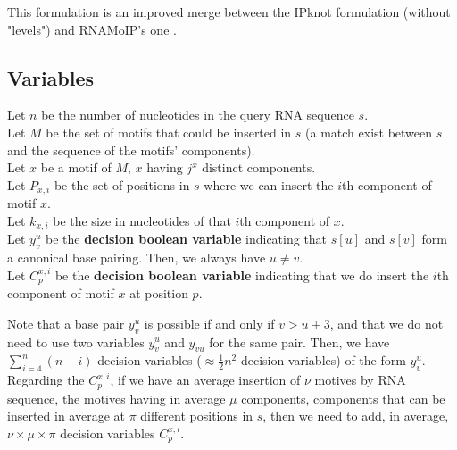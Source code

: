 \documentclass{article}
\begin{document}
This formulation is an improved merge between the IPknot \cite{sato_ipknot:_2011} formulation (without "levels") and RNAMoIP's one \cite{reinharz_towards_2012}.
	
	
\subsection{Variables} 
	
Let $n$ be the number of nucleotides in the query RNA sequence $s$.\\
Let $M$ be the set of motifs that could be inserted in $s$ (a match exist between $s$ and the sequence of the motifs' components).\\
Let $x$ be a motif of $M$, $x$ having $j^x$ distinct components.\\
Let $P_{x,i}$ be the set of positions in $s$ where we can insert the $i$th component of motif $x$.\\
Let $k_{x,i}$ be the size in nucleotides of that $i$th component of $x$.\\
Let $y^u_v$ be the \textbf{decision boolean variable} indicating that $s[u]$ and $s[v]$ form a canonical base pairing. Then, we always have $u \neq v$.\\
Let $C^{x,i}_p$ be the \textbf{decision boolean variable} indicating that we do insert the $i$th component of motif $x$ at position $p$.
	
	
Note that a base pair $y^u_v$ is possible if and only if $v>u+3$, and that we do not need to use two variables $y^u_v$ and $y_{vu}$ for the same pair. 
Then, we have $\sum_{i=4}^n (n-i)$ decision variables ($\approx \frac{1}{2}n^2$ decision variables) of the form $y^u_v$.
Regarding the $C^{x,i}_p$, if we have an average insertion of $\nu$ motives by RNA sequence, the motives having in average $\mu$ components, components that can be inserted in average at $\pi$ different positions in $s$,
then we need to add, in average, $\nu \times \mu \times \pi$ decision variables $C^{x,i}_p$.
\end{document}
